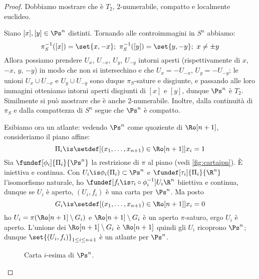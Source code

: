 \begin{proof}
	Dobbiamo mostrare che è $T_2$, 2-numerabile, compatto e localmente euclideo.

	Siano $[x], [y] \in \Ps^n$ distinti. Tornando alle controimmagini in $S^n$ abbiamo:
	\[\pi_S^{-1}([x]) = \set{x, -x}; \
	\pi_S^{-1}([y]) = \set{y, -y}; \
	x \neq \pm y \]
	Allora possiamo prendere $U_x$, $U_{-x}$, $U_y$, $U_{-y}$ intorni aperti 
	(rispettivamente di $x$, $-x$, $y$, $-y$)
	in modo che non si intersechino e che $U_x = -U_{-x}$, $U_y = -U_{-y}$;
	le unioni $U_x \cup U_{-x}$ e $U_y \cup U_{-y}$ sono duque $\pi_S$-sature e disgiunte,
	e passando alle loro immagini otteniamo intorni aperti disgiunti di $[x]$ e $[y]$,
	dunque $\Ps^n$ è $T_2$.
	Similmente si può mostrare che è anche 2-numerabile.
	Inoltre, dalla continuità di $\pi_S$ e dalla compattezza di $S^n$ segue che $\Ps^n $ è compatto.

	Esibiamo ora un atlante: vedendo $\Ps^n$ come quoziente di $\Ro[n+1]$,
	consideriamo il piano affine:
	\[ \Pi_i\is\setdef[(x_1, \dots, x_{n+1})\in {\Ro[n+1]}]{x_i = 1} \]
	Sia $\fundef[\phi_i]{\Pi_i}{\Ps^n}$ la restrizione di $\pi$ al piano (vedi \autoref{fig:cartaipn}).
	È iniettiva e continua.
	Con $U_i \is \phi_i(\Pi_i) \subset \Ps^n$ e $\fundef[\tau_i]{\Pi_i}{\R^n}$ l'isomorfismo naturale,
	ho $\fundef[f_i \is \tau_i \circ \phi_i^{-1}]{U_i}{\R^n}$ biiettiva e continua,
	dunque se $U_i$ è aperto, $(U_i, f_i)$ è una carta per $\Ps^n$. Ma posto
	\[ G_i \is \setdef[(x_1, \dots, x_{n+1})\in {\Ro[n+1]}]{x_i = 0} \]
	ho $U_i = \pi(\Ro[n+1] \setminus G_i)$ e $\Ro[n+1] \setminus G_i$ è un aperto $\pi$-saturo,
	ergo $U_i$ è aperto.
	L'unione dei $\Ro[n+1]\setminus G_i$ è $\Ro[n+1]$ quindi gli $U_i$ ricoprono $\Ps^n$;
	dunque $\set{(U_i, f_i)}_{1 \leq i \leq n+1}$ è un atlante per $\Ps^n$.
	\begin{figure}
		\centering
		\caption{Carta $i$-esima di $\Ps^n$.}
		\label{fig:cartaipn}
	\end{figure}
\end{proof}

